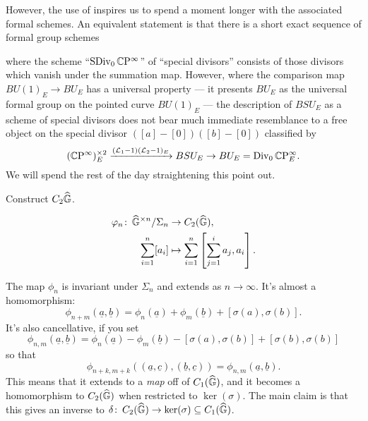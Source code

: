 However, the use of  inspires us to spend a moment longer with the associated formal schemes.  An equivalent statement is that there is a short exact sequence of formal group schemes
\begin{center}
\end{center}
where the scheme ``$\operatorname{SDiv}_0 \mathbb{C}\mathrm P^\infty$'' of ``special divisors'' consists of those divisors which vanish under the summation map.  However, where the comparison map $BU(1)_E \to BU_E$ has a universal property --- it presents $BU_E$ as the universal formal group on the pointed curve $BU(1)_E$ --- the description of $BSU_E$ as a scheme of special divisors does not bear much immediate resemblance to a free object on the special divisor $([a] - [0])([b] - [0])$ classified by \[(\mathbb{C}\mathrm P^\infty)^{\times 2}_E \xrightarrow{(\mathcal{L}_1 - 1)(\mathcal{L}_2 - 1)_E} BSU_E \to BU_E = \operatorname{Div}_0 \mathbb{C}\mathrm P^\infty_E.\]  We will spend the rest of the day straightening this point out.








Construct $C_2 \widehat{\mathbb G}$.



\begin{align*}
\varphi_n \colon\thinspace \widehat{\mathbb G}^{\times n} / \Sigma_n & \to C_2(\widehat{\mathbb G}), \\
\sum_{i=1}^n [a_i] & \mapsto \sum_{i=1}^n \left[\sum_{j=1}^i a_j, a_i \right].
\end{align*}

 The map $\phi_n$ is invariant under $\Sigma_n$ and extends as $n \to \infty$.   It's almost a homomorphism: \[\phi_{n+m}(\underline a, \underline b) = \phi_n(\underline a) + \phi_m(\underline b) + [\sigma(a), \sigma(b)].\]   It's also cancellative, if you set \[\phi_{n, m}(\underline a, \underline b) = \phi_n(\underline a) - \phi_m(\underline b) - [\sigma(a), \sigma(b)] + [\sigma(b), \sigma(b)]\] so that \[\phi_{n+k,m+k}((\underline a, \underline c), (\underline b, \underline c)) = \phi_{n,m}(\underline a, \underline b).\]  This means that it extends to a \emph{map} off of $C_1(\widehat{\mathbb G})$, and it becomes a homomorphism to $C_2(\widehat{\mathbb G})$ when restricted to $\ker(\sigma)$.  The main claim is that this gives an inverse to $\delta\colon\thinspace C_2(\widehat{\mathbb G}) \to \ker(\sigma) \subseteq C_1(\widehat{\mathbb G})$.











